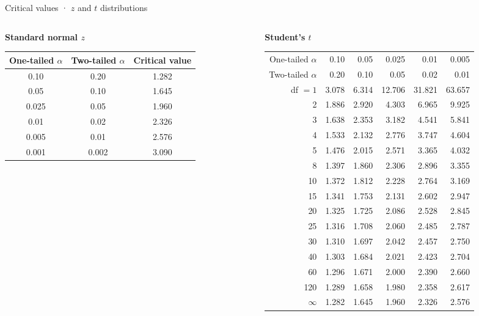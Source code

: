 \documentclass[
  11pt,
  ignorenonframetext,
  aspectratio=169,
]{beamer}
\renewcommand{\arraystretch}{1.25}
\begin{document}
\begin{frame}[shrink=5]{Critical values · \(z\) and \(t\) distributions}
\protect{}\label{critical-values-z-and-t}
\begin{columns}[T]
\begin{column}{0.33\textwidth}
\centering
\textbf{Standard normal \(z\)}\\[0.4em]
\footnotesize
\begin{tabular}{@{}ccc@{}}
\toprule
One-tailed \(\alpha\) & Two-tailed \(\alpha\) & Critical value \\
\midrule
0.10  & 0.20  & 1.282 \\
0.05  & 0.10  & 1.645 \\
0.025 & 0.05  & 1.960 \\
0.01  & 0.02  & 2.326 \\
0.005 & 0.01  & 2.576 \\
0.001 & 0.002 & 3.090 \\
\bottomrule
\end{tabular}
\end{column}

\begin{column}{0.63\textwidth}
\centering
\textbf{Student's \(t\)}\\[0.4em]
\scriptsize
\renewcommand{\arraystretch}{0.95}
\begin{tabular}{@{}r*{5}{r}@{}}
\toprule
One-tailed \(\alpha\) & 0.10 & 0.05 & 0.025 & 0.01 & 0.005 \\
Two-tailed \(\alpha\) & 0.20 & 0.10 & 0.05  & 0.02 & 0.01  \\
\midrule
df \(=1\) & 3.078 & 6.314 & 12.706 & 31.821 & 63.657 \\
2        & 1.886 & 2.920 & 4.303  & 6.965  & 9.925  \\
3        & 1.638 & 2.353 & 3.182  & 4.541  & 5.841  \\
4        & 1.533 & 2.132 & 2.776  & 3.747  & 4.604  \\
5        & 1.476 & 2.015 & 2.571  & 3.365  & 4.032  \\
8        & 1.397 & 1.860 & 2.306  & 2.896  & 3.355  \\
10       & 1.372 & 1.812 & 2.228  & 2.764  & 3.169  \\
15       & 1.341 & 1.753 & 2.131  & 2.602  & 2.947  \\
20       & 1.325 & 1.725 & 2.086  & 2.528  & 2.845  \\
25       & 1.316 & 1.708 & 2.060  & 2.485  & 2.787  \\
30       & 1.310 & 1.697 & 2.042  & 2.457  & 2.750  \\
40       & 1.303 & 1.684 & 2.021  & 2.423  & 2.704  \\
60       & 1.296 & 1.671 & 2.000  & 2.390  & 2.660  \\
120      & 1.289 & 1.658 & 1.980  & 2.358  & 2.617  \\
\midrule
\(\infty\) & 1.282 & 1.645 & 1.960 & 2.326 & 2.576 \\
\bottomrule
\end{tabular}
\end{column}
\end{columns}


\end{frame}
\end{document}
